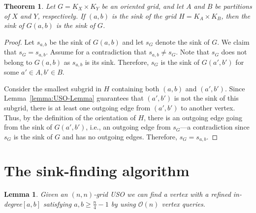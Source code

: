 \documentclass[a4paper,10pt]{article}
\newtheorem{lemma}{Lemma}
\newtheorem{theorem}{Theorem}
\newcommand{\indegree}{refined in-degree\xspace}
\begin{document}
\begin{theorem}
\label{thm:the_sink_of_the_sink_of_the_induced_orientation_is_the_global_sink}
Let $G = K_X \times K_Y$ be an oriented grid,
and let $A$ and $B$ be partitions of $X$ and $Y$, respectively.
If $(a,b)$ is the sink of the grid $H = K_A \times K_B$, then the sink of $G(a,b)$ is the sink of $G$.
\end{theorem}
\begin{proof}
Let $s_{a,b}$ be the sink of $G(a, b)$ and let $s_G$ denote the sink of $G$.
We claim that $s_G = s_{a,b}$.
Assume for a contradiction that $s_{a,b}\neq s_G$.
Note that $s_G$ does not belong to $G(a,b)$ as $s_{a,b}$ is its sink.
Therefore, $s_G$ is the sink of $G(a', b')$ for some $a'\in A, b'\in B$.

Consider the smallest subgrid in $H$ containing both $(a,b)$ and $(a', b')$. 
Since Lemma~\ref{lemma:USO-Lemma} guarantees that $(a', b')$ is not the sink of this subgrid, there is at least one outgoing edge from $(a', b')$ to another vertex. Thus, by the definition of the orientation of $H$, there is an outgoing edge going from the sink of $G(a', b')$, i.e., an outgoing edge from $s_G$---a contradiction since $s_G$ is the sink of $G$ and has no outgoing edges. Therefore, $s_G = s_{a,b}$.
\end{proof}

\section{The sink-finding algorithm}


\begin{lemma}
\label{lem:seed_lemma_for_square_matrices}
 Given an $(n, n)$-grid USO we can find a vertex with a \indegree $[a,b]$ satisfying $a, b \geq \frac{n}{4} - 1$ by using $\mathcal{O}(n)$ vertex queries.
\end{lemma}
\end{document}
